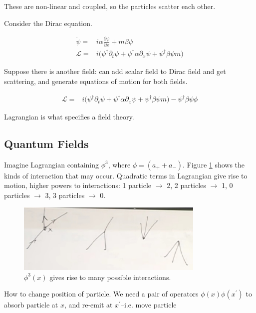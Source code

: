 \documentclass[]{article}
\begin{document}
These are non-linear and coupled, so the particles scatter each other.

Consider the Dirac equation.

\begin{align*}
\dot{\psi} =& i \alpha \frac{\partial \psi}{\partial x} + m \beta \psi\\
\mathcal{L} =& i \big( \psi^\dagger \partial_t \psi +  \psi^\dagger \alpha \partial_x \psi + \psi^\dagger \beta \psi m \big)
\end{align*}

Suppose there is another field: can add scalar field to Dirac field and get scattering, and generate equations of motion for both fields.

\begin{align*}
\mathcal{L} =& i \big( \psi^\dagger \partial_t \psi +  \psi^\dagger \alpha \partial_x \psi + \psi^\dagger \beta \psi m \big) - \psi^\dagger \beta \psi \phi
\end{align*}

Lagrangian is what specifies a field theory.

\subsection{Quantum Fields}

Imagine Lagrangian containing $\phi^3$, where $\phi = (a_+ + a_-)$.
Figure \ref{fig:phi:3:x} shows the kinds of interaction that may occur. Quadratic terms in Lagrangian give rise to motion, higher powers to interactions: 1 particle $\rightarrow$ 2, 2 particles $\rightarrow$ 1, 0 particles $\rightarrow$ 3, 3 particles $\rightarrow$ 0.
 
\begin{figure}[H]
	\caption{$\phi^3(x)$ gives rise to many possible interactions.}\label{fig:phi:3:x}
	\includegraphics[width=0.8\textwidth]{phi-3-x}
\end{figure}

How to change position of particle. We need a pair of operators $\phi(x) \phi(x^\prime)$ to absorb particle at $x$, and re-emit at $x^\prime$--i.e. move particle
\end{document}
